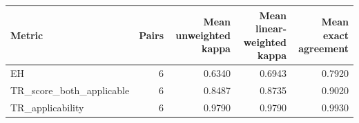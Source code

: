 \begin{tabular}{lrrrr}
\toprule
Metric & Pairs & Mean unweighted kappa & Mean linear-weighted kappa & Mean exact agreement \\
\midrule
EH & 6 & 0.6340 & 0.6943 & 0.7920 \\
TR\_score\_both\_applicable & 6 & 0.8487 & 0.8735 & 0.9020 \\
TR\_applicability & 6 & 0.9790 & 0.9790 & 0.9930 \\
\bottomrule
\end{tabular}
